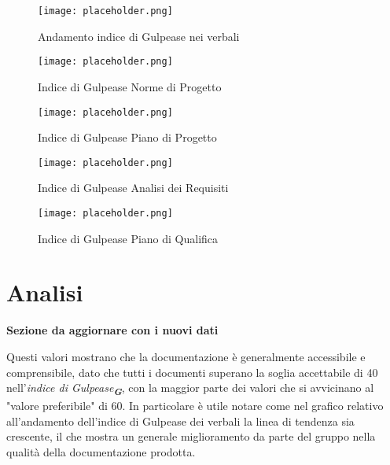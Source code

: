 \begin{figure}[h!] 
    \centering
    \texttt{[image: placeholder.png]}
    \caption{Andamento indice di Gulpease nei verbali} 
    \label{fig: Andamento Gulpease verbali}
\end{figure}

\begin{figure}[h!]
    \centering

    \begin{minipage}{.4\textwidth}
        \centering
        \texttt{[image: placeholder.png]}
        \caption{Indice di Gulpease Norme di Progetto}
        \label{fig:Gulpease Norme Progetto}
    \end{minipage}
    \hfill
    \begin{minipage}{.4\textwidth}
        \centering
        \texttt{[image: placeholder.png]}
        \caption{Indice di Gulpease Piano di Progetto}
        \label{fig:Gulpease Piano Progetto}
    \end{minipage}

\end{figure}

\begin{figure}[H]
    \centering

    \begin{minipage}{.4\textwidth}
        \centering
        \texttt{[image: placeholder.png]}
        \caption{Indice di Gulpease Analisi dei Requisiti}
        \label{fig:Gulpease Analisi Requisiti}
    \end{minipage}%
    \hfill
    \begin{minipage}{.4\textwidth}
        \centering
        \texttt{[image: placeholder.png]}
        \caption{Indice di Gulpease Piano di Qualifica}
        \label{fig:Gulpease Piano Qualifica}
    \end{minipage}

\end{figure}


\section*{Analisi}

\textbf{Sezione da aggiornare con i nuovi dati}

Questi valori mostrano che la documentazione è generalmente accessibile e comprensibile, 
dato che tutti i documenti superano la soglia accettabile di 40 nell'\emph{indice di Gulpease}\textsubscript{\textbf{\textit{G}}}, 
con la maggior parte dei valori che si avvicinano al "valore preferibile" di 60. 
In particolare è utile notare come nel grafico relativo all'andamento dell'indice di Gulpease dei verbali la linea di tendenza sia crescente,
il che mostra un generale miglioramento da parte del gruppo nella qualità della documentazione prodotta.

